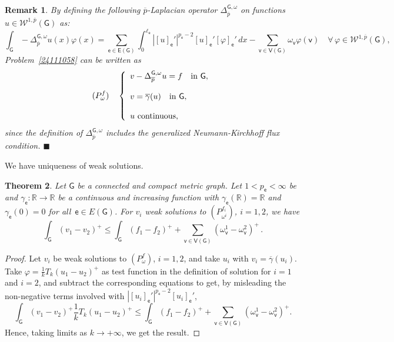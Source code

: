 \documentclass[reqno,12pt]{amsart}
\newtheorem{theorem}{Theorem}[section]
\newtheorem{remark}[theorem]{Remark}
\def\R{\mathbb R} %
\def\e{\mathsf{e}} 	%
\def\v{\mathsf{v}}	%
\newcommand{\G}{\mathsf{G}}	%
\newcommand{\V}{\mathsf{V}}	%
\newcommand{\E}{\mathsf{E}}	%
\numberwithin{equation}{section} %
\begin{document}
\begin{remark}\label{defdelplaplacianoenG}
\rm By defining the following $\overline{p}$-{\it Laplacian operator} $\Delta_{\overline{p}}^{\G,\omega}$ on functions $u\in \mathcal{W}^{1,\overline{p}}(\G)$ as:
$$\int_\G-\Delta_{\overline{p}}^{\G,\omega}u (x)\varphi(x)=\sum_{\e \in\E(\G)}\int_{0}^{\ell_\e}|[u]_\e'|^{p_\e-2}[u]_\e' [\varphi]_\e'\,   dx-\sum_{\v\in \V(\G)}\omega_\v\varphi(\v) \quad \forall \, \varphi \in \mathcal{W}^{1,\overline{p}}(\G),$$
Problem~\eqref{24111058} can be written as
$$  (P_{\omega}^f)\quad\left\{\begin{array}{l}
v-\Delta^{\G,\omega}_{\overline{p}}u=f\quad\hbox{in } \G,\\
\\{}
v=\overline{\gamma}(u)\quad\hbox{in } \G,
\\ \\
\hbox{$u$ continuous,}
\end{array}\right.$$
since  the definition of $\Delta^{\G,\omega}_{\overline{p}}$  includes the generalized Neumann-Kirchhoff flux condition.
\hfill$\blacksquare$
 \end{remark}

 We have uniqueness of weak solutions. 

 \begin{theorem}\label{teocontprin001} Let  $\G$ be a  connected and compact metric graph.
  Let $1 < p_\e < \infty$ be and   $\gamma_\e:\R\to \R$ be a continuous and increasing function with $\gamma_\e(\mathbb{R})=\mathbb{R}$ and $\gamma_\e(0)=0$ for all~$\e \in E(\G)$.
   For $v_i$ weak solutions  to $(P_{\omega^i}^{f_i})$, $i=1,2$, we have  
$$\int_{\G}(v_1-v_2)^+\le \int_{\G}(f_1-f_2)^+ + \sum_{\v\in\V(\G)}(\omega^1_\v-\omega^2_\v)^+\,.$$
\end{theorem}

\begin{proof} Let $v_i$  be weak solutions to $(P_{\omega}^f)$, $i=1,2$, and take $ u_i$ with $v_i= \overline{\gamma}(u_i)$.
    Take $\varphi=\frac{1}{k}T_k(u_1-u_2)^+$ as test function in the definition of solution for $i=1$ and $i=2$, and subtract the corresponding equations to get, by misleading the non-negative terms involved with $|[u_i]_\e'|^{p_\e-2}[u_i]_\e'$, 
    $$\int_\G(v_1-v_2)^+\frac{1}{k}T_k(u_1-u_2)^+\le \int_\G(f_1-f_2)^++\sum_{\v\in \V(\G)}(\omega^1_\v-\omega^2_\v)^+.$$
    Hence, taking limits as $k\to +\infty$, we get the result.
\end{proof}

 
\end{document}
